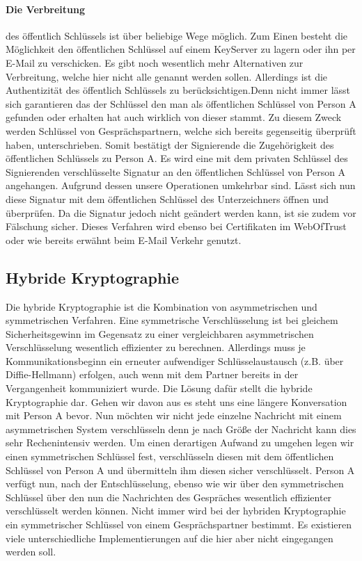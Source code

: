 \documentclass[paper=a4,11pt,german]{scrartcl} %
\begin{document}
\paragraph{Die Verbreitung}
des öffentlich Schlüssels ist über beliebige Wege möglich. Zum Einen besteht die Möglichkeit den öffentlichen Schlüssel auf einem KeyServer zu lagern oder ihn per E-Mail zu verschicken. Es gibt noch wesentlich mehr Alternativen zur Verbreitung, welche hier nicht alle genannt werden sollen. Allerdings ist die Authentizität des öffentlich Schlüssels zu berücksichtigen.Denn nicht immer lässt sich garantieren das der Schlüssel den man als öffentlichen Schlüssel von Person A gefunden oder erhalten hat auch wirklich von dieser stammt. Zu diesem Zweck werden Schlüssel von Gesprächspartnern, welche sich bereits gegenseitig überprüft haben, unterschrieben. Somit bestätigt der Signierende die Zugehörigkeit des öffentlichen Schlüssels zu Person A. Es wird eine mit dem privaten Schlüssel des Signierenden verschlüsselte Signatur an den öffentlichen Schlüssel von Person A angehangen. Aufgrund dessen unsere Operationen umkehrbar sind. Lässt sich nun diese Signatur mit dem öffentlichen Schlüssel des Unterzeichners öffnen und überprüfen. Da die Signatur jedoch nicht geändert werden kann, ist sie zudem vor Fälschung sicher. Dieses Verfahren wird ebenso bei Certifikaten im WebOfTrust oder wie bereits erwähnt beim E-Mail Verkehr genutzt.

\subsection{Hybride Kryptographie}
Die hybride Kryptographie ist die Kombination von asymmetrischen und symmetrischen Verfahren. Eine symmetrische Verschlüsselung ist bei gleichem Sicherheitsgewinn im Gegensatz zu einer vergleichbaren asymmetrischen Verschlüsselung  wesentlich effizienter zu berechnen. Allerdings muss je Kommunikationsbeginn ein erneuter aufwendiger Schlüsselaustausch (z.B. über Diffie-Hellmann) erfolgen, auch wenn mit dem Partner bereits in der Vergangenheit kommuniziert wurde. Die Lösung dafür stellt die hybride Kryptographie dar. Gehen wir davon aus es steht uns eine längere Konversation mit Person A bevor. Nun möchten wir nicht jede einzelne Nachricht mit einem asymmetrischen System verschlüsseln denn je nach Größe der Nachricht kann dies sehr Rechenintensiv werden. Um einen derartigen Aufwand zu umgehen legen wir einen symmetrischen Schlüssel fest, verschlüsseln diesen mit dem öffentlichen Schlüssel von Person A und übermitteln ihm diesen sicher verschlüsselt. Person A verfügt nun, nach der Entschlüsselung, ebenso wie wir über den symmetrischen Schlüssel über den nun die Nachrichten des Gespräches wesentlich effizienter verschlüsselt werden können. Nicht immer wird bei der hybriden Kryptographie ein symmetrischer Schlüssel von einem Gesprächspartner bestimmt. Es existieren viele unterschiedliche Implementierungen auf die hier aber nicht eingegangen werden soll.
\end{document}
